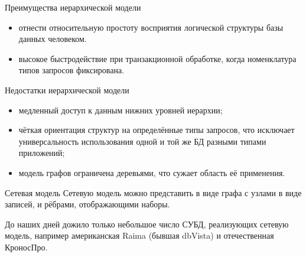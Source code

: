 \documentclass{beamer}
\begin{document}
\begin{frame}
\begin{block}{Преимущества иерархической модели}
\begin{itemize}
\item отнести относительную простоту восприятия логической структуры базы данных человеком.
\item высокое быстродействие при транзакционной обработке, когда номенклатура типов запросов фиксирована.
\end{itemize}
\end{block}
\begin{block}{Недостатки иерархической модели}
\begin{itemize}
\item медленный доступ к данным нижних уровней иерархии;
\item чёткая ориентация структур на определённые типы запросов, что исключает универсальность использования одной и той же БД разными типами приложений;
\item модель графов ограничена деревьями, что сужает область её применения.
\end{itemize}
\end{block}
\end{frame}

\begin{frame}
\begin{block}{Сетевая модель}
Сетевую модель можно представить в виде графа с узлами в виде записей, и рёбрами, отображающими наборы.
\end{block}
До наших дней дожило только небольшое число СУБД, реализующих сетевую модель, например американская Raima (бывшая dbVista) и отечественная КроносПро.
\end{frame}
\end{document}
